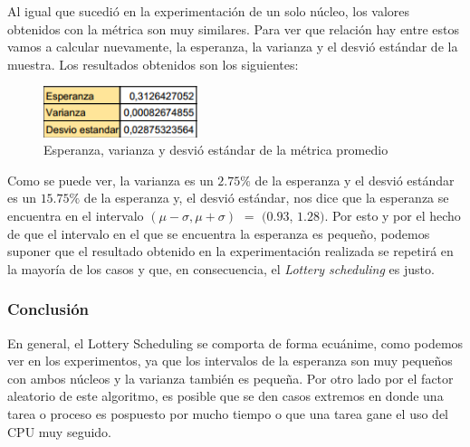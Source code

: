 Al igual que sucedió en la experimentación de un solo núcleo, los valores obtenidos con la métrica son muy similares.
Para ver que relación hay entre estos vamos a calcular nuevamente, la esperanza, la varianza y el desvió estándar de la muestra.
Los resultados obtenidos son los siguientes:
\begin{figure}[H]
\begin{center}
\includegraphics[width=0.4\textwidth]{img/fotaza2.png}
     \caption{Esperanza, varianza y desvió estándar de la métrica promedio}
\end{center}
\end{figure}

Como se puede ver, la varianza es un $2.75\%$ de la esperanza y el desvió estándar es un $15.75\%$ de la esperanza y, el desvió estándar, nos dice que la esperanza se encuentra en el intervalo $(\mu - \sigma, \mu + \sigma)$ $=$ $(0.93$, $1.28)$.
Por esto y por el hecho de que el intervalo en el que se encuentra la esperanza es pequeño, podemos suponer que el resultado obtenido en la experimentación realizada se repetirá en la mayoría de los casos y que, en consecuencia, el \textit{Lottery scheduling} es justo.

\subsubsection{Conclusión}

En general, el Lottery Scheduling se comporta de forma ecuánime, como podemos ver en los experimentos, ya que los intervalos de la esperanza son muy pequeños con ambos núcleos y la varianza también es pequeña. Por otro lado por el factor aleatorio de este algoritmo, es posible que se den casos extremos en donde una tarea o proceso es pospuesto por mucho tiempo o que una tarea gane el uso del CPU muy seguido.
